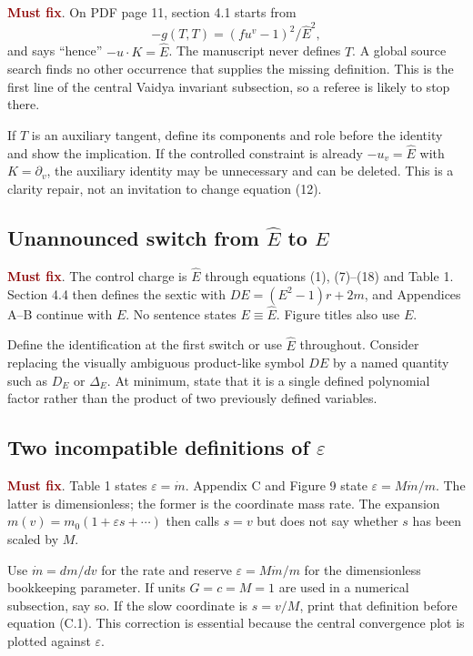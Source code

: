\documentclass[11pt,a4paper]{article}
\newcommand{\must}{\textcolor{DarkRed}{\textbf{Must fix}}}
\newcommand{\Ehat}{\hat E}
\begin{document}
\must. On PDF page 11, section 4.1 starts from
\[
  -g(T,T)=(f u^v-1)^2/\Ehat^2,
\]
and says ``hence'' $-u\!\cdot\!K=\Ehat$. The manuscript never defines $T$. A global source
search finds no other occurrence that supplies the missing definition. This is the first line
of the central Vaidya invariant subsection, so a referee is likely to stop there.

If $T$ is an auxiliary tangent, define its components and role before the identity and show the
implication. If the controlled constraint is already $-u_v=\Ehat$ with $K=\partial_v$, the
auxiliary identity may be unnecessary and can be deleted. This is a clarity repair, not an
invitation to change equation (12).

\subsection{Unannounced switch from $\Ehat$ to $E$}

\must. The control charge is $\Ehat$ through equations (1), (7)--(18) and Table 1. Section 4.4
then defines the sextic with $DE=(E^2-1)r+2m$, and Appendices A--B continue with $E$. No
sentence states $E\equiv\Ehat$. Figure titles also use $E$.

Define the identification at the first switch or use $\Ehat$ throughout. Consider replacing
the visually ambiguous product-like symbol $DE$ by a named quantity such as $D_E$ or
$\Delta_E$. At minimum, state that it is a single defined polynomial factor rather than the
product of two previously defined variables.

\subsection{Two incompatible definitions of $\varepsilon$}

\must. Table 1 states $\varepsilon=\dot m$. Appendix C and Figure 9 state
$\varepsilon=M\dot m/m$. The latter is dimensionless; the former is the coordinate mass rate.
The expansion $m(v)=m_0(1+\varepsilon s+\cdots)$ then calls $s=v$ but does not say whether $s$
has been scaled by $M$.

Use $\dot m=dm/dv$ for the rate and reserve $\varepsilon=M\dot m/m$ for the dimensionless
bookkeeping parameter. If units $G=c=M=1$ are used in a numerical subsection, say so. If the
slow coordinate is $s=v/M$, print that definition before equation (C.1). This correction is
essential because the central convergence plot is plotted against $\varepsilon$.
\end{document}
